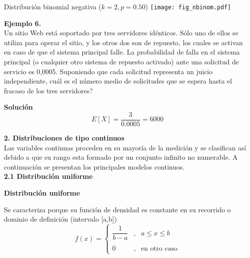 \documentclass[base=hide,12pt]{elegantbook}
\begin{document}
\begin{center}
	Distribución binomial negativa ($k=2, p=0.50$)
	\texttt{[image: fig\_nbinom.pdf]}
\end{center} 	

\vspace{.5cm} 
\textcolor{col3}{\bf \large Ejemplo 6.} \\
Un sitio Web está soportado por tres servidores idénticos. Sólo uno de ellos se utiliza para operar el sitio, y los otros dos son de repuesto, los  cuales se activan en caso de que el sistema principal falle. La probabilidad de falla en el sistema principal (o cualquier otro sistema de repuesto activado) ante una solicitud de servicio es 0,0005. Suponiendo que cada solicitud representa un juicio independiente, cuál es el número medio de solicitudes que se espera hasta el fracaso de los tres servidores?
\vspace{.5cm} 

\textcolor{col3}{\bf \large  Solución}\\
$$E[X]=\dfrac{3}{0.0005}= 6000 $$

\newpage

\textcolor{col4}{\LARGE  \bf 2. Distribuciones de tipo continuos}\\

Las variables continuas proceden en su mayoría de la medición y se clasifican así debido a que su rango esta formado por un conjunto infinito no numerable. A continuación se presentan los principales modelos continuos.\\

\vspace{.5cm}
\textcolor{col4}{\LARGE  \bf 2.1 Distribución uniforme }\\


\begin{Box2}{\bf Distribución uniforme}
	
	\noindent Se caracteriza porque su función de densidad es constante en su recorrido o dominio de definición (intervalo [a,b])
	\begin{equation*}
		f(x)=\left\lbrace
		\begin{array}{lll}
			\dfrac{1}{b-a}	 &,& a \leq x \leq b   \\
			&&\\
			0 &,& \mbox{en otro caso}
		\end{array}
		\right.
	\end{equation*}
\end{Box2}
\end{document}
